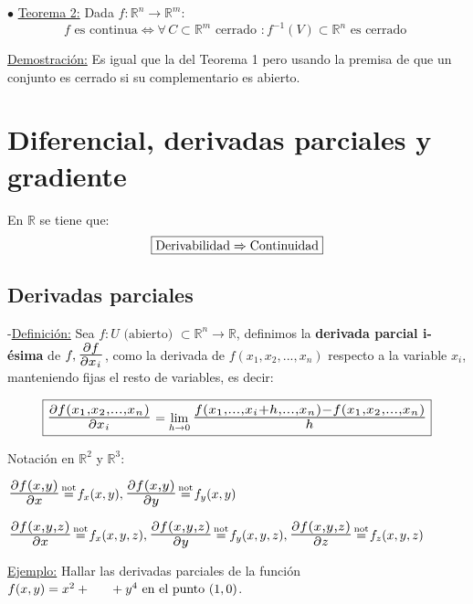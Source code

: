 \documentclass[12pt, titlepage]{article}
\newcommand{\eqc}[1]{\stackrel{\mathclap{\normalfont\mbox{\scriptsize{#1}}}}{=}}
\newcommand{\R}{\mathbb{R}}
\newcommand{\bfrac}[2]{\scalebox{1.4}{$\frac{#1}{#2}$}}
\newcommand{\definicion}{\noindent-\underline{Definición:} }
\newcommand{\teorema}[1][\!\!]{\noindent$\bullet$ \underline{Teorema #1:} }
\begin{document}
\teorema[2] Dada $f : \R^n \to \R^m$:
\[
\boxed{
f \text{ es continua} \iff \forall \, C \subset \R^m \text{ cerrado } : f^{-1} (V) \subset \R^n \text{ es 
cerrado }
}
\]
\vspace{0mm}

\underline{Demostración:} Es igual que la del Teorema 1 pero usando la premisa de que un conjunto es 
cerrado si su complementario es abierto.
\vspace{5mm}


\section{Diferencial, derivadas parciales y gradiente}
\vspace{3mm}

En $\R$ se tiene que:
\[
\boxed{
\text{Derivabilidad} \Rightarrow \text{Continuidad}
}
\vspace{3mm}
\]

\subsection{Derivadas parciales}
\vspace{5mm}

\definicion Sea $f : U \text{ (abierto) } \subset \R^n \to \R$, definimos la \textbf{derivada parcial i-ésima} de 
$f, \bfrac{\partial f}{\partial x_i}$, como la derivada de $f (x_1, x_2,..., x_n)$ respecto a la variable $x_i$, manteniendo fijas el resto de variables, es decir:

\[
\boxed{
\bfrac{\partial f (x_1, x_2,..., x_n)}{\partial x_i} = \displaystyle \lim_{h \to 0} \bfrac{f (x_1,..., x_i+h,...,x_n)  
- f (x_1, x_2,..., x_n)}{h}
}
\]
\vspace{3mm}

Notación en $\R^2$ y $\R^3$:
\vspace{3mm}

$\bfrac{\partial f (x, y)}{\partial x} \eqc{not} f_x (x, y), \bfrac{\partial f (x, y)}{\partial y} \eqc{not} f_y (x, y) 
$
\vspace{3mm}

$\bfrac{\partial f (x, y, z)}{\partial x} \eqc{not} f_x (x, y, z), \bfrac{\partial f (x, y, z)}{\partial y} \eqc{not} f_y (x, y, z) , \bfrac{\partial f (x, y, z)}{\partial z} \eqc{not} f_z (x, y, z)
$
\vspace{5mm}

\underline{Ejemplo:} Hallar las derivadas parciales de la función $f (x, y) = x^2 + \vspace{1mm} \\ \indent 
+ y^4 \text{ en el punto } (1, 0)$.
\vspace{3mm}
\end{document}
